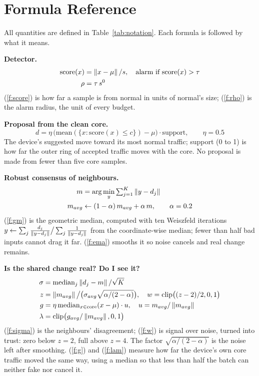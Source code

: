 \section{Formula Reference}\label{app:formulas}
All quantities are defined in Table~\ref{tab:notation}. Each formula is followed by what it means.

\noindent\textbf{Detector.}
\begin{align}
\mathrm{score}(x)&=\left\lVert x-\mu \right\rVert/s, \quad \text{alarm if } \mathrm{score}(x)>\tau \label{f:score}\\
\rho&=\tau\,s^0 \label{f:rho}
\end{align}
(\ref{f:score}) is how far a sample is from normal in units of normal's size; (\ref{f:rho}) is the alarm
radius, the unit of every budget.

\noindent\textbf{Proposal from the clean core.}
\begin{equation}
d=\eta\,\big(\mathrm{mean}(\{x:\mathrm{score}(x)\le c\})-\mu\big)\cdot \mathrm{support},\qquad \eta=0.5 \label{f:prop}
\end{equation}
The device's suggested move toward its most normal traffic; support (0 to 1) is how far the outer ring of
accepted traffic moves with the core. No proposal is made from fewer than five core samples.

\noindent\textbf{Robust consensus of neighbours.}
\begin{align}
m&=\arg\min_y \textstyle\sum_{j=1}^{K}\left\lVert y-d_j \right\rVert \label{f:gm}\\
m_{avg}&\leftarrow(1-\alpha)\,m_{avg}+\alpha\,m,\qquad \alpha=0.2 \label{f:ema}
\end{align}
(\ref{f:gm}) is the geometric median, computed with ten Weiszfeld iterations
$y\leftarrow\sum_j \frac{d_j}{\left\lVert y-d_j \right\rVert}\big/\sum_j\frac{1}{\left\lVert y-d_j \right\rVert}$ from the coordinate-wise median;
fewer than half bad inputs cannot drag it far. (\ref{f:ema}) smooths it so noise cancels and real change remains.

\noindent\textbf{Is the shared change real? Do I see it?}
\begin{align}
\sigma&=\mathrm{median}_j\left\lVert d_j-m \right\rVert/\sqrt{K} \label{f:sigma}\\
z&=\left\lVert m_{avg} \right\rVert\big/\big(\sigma_{avg}\sqrt{\alpha/(2-\alpha)}\big),\quad w=\mathrm{clip}\big((z-2)/2,0,1\big) \label{f:w}\\
g&=\eta\,\mathrm{median}_{x\in\mathrm{core}}(x-\mu)\cdot u,\quad u=m_{avg}/\left\lVert m_{avg} \right\rVert \label{f:g}\\
\lambda&=\mathrm{clip}\big(g_{avg}/\left\lVert m_{avg} \right\rVert,0,1\big) \label{f:lam}
\end{align}
(\ref{f:sigma}) is the neighbours' disagreement; (\ref{f:w}) is signal over noise, turned into trust: zero
below $z=2$, full above $z=4$. The factor $\sqrt{\alpha/(2-\alpha)}$ is the noise left after smoothing.
(\ref{f:g}) and (\ref{f:lam}) measure how far the device's own core traffic moved the same way, using a
median so that less than half the batch can neither fake nor cancel it.

